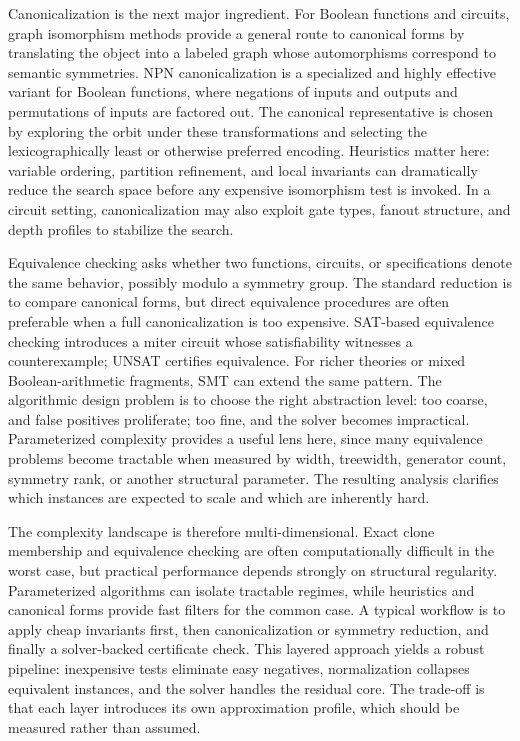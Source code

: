 \documentclass[11pt]{article}
\begin{document}
Canonicalization is the next major ingredient. For Boolean functions and circuits, graph isomorphism methods provide a general route to canonical forms by translating the object into a labeled graph whose automorphisms correspond to semantic symmetries. NPN canonicalization is a specialized and highly effective variant for Boolean functions, where negations of inputs and outputs and permutations of inputs are factored out. The canonical representative is chosen by exploring the orbit under these transformations and selecting the lexicographically least or otherwise preferred encoding. Heuristics matter here: variable ordering, partition refinement, and local invariants can dramatically reduce the search space before any expensive isomorphism test is invoked. In a circuit setting, canonicalization may also exploit gate types, fanout structure, and depth profiles to stabilize the search.

Equivalence checking asks whether two functions, circuits, or specifications denote the same behavior, possibly modulo a symmetry group. The standard reduction is to compare canonical forms, but direct equivalence procedures are often preferable when a full canonicalization is too expensive. SAT-based equivalence checking introduces a miter circuit whose satisfiability witnesses a counterexample; UNSAT certifies equivalence. For richer theories or mixed Boolean-arithmetic fragments, SMT can extend the same pattern. The algorithmic design problem is to choose the right abstraction level: too coarse, and false positives proliferate; too fine, and the solver becomes impractical. Parameterized complexity provides a useful lens here, since many equivalence problems become tractable when measured by width, treewidth, generator count, symmetry rank, or another structural parameter. The resulting analysis clarifies which instances are expected to scale and which are inherently hard.

The complexity landscape is therefore multi-dimensional. Exact clone membership and equivalence checking are often computationally difficult in the worst case, but practical performance depends strongly on structural regularity. Parameterized algorithms can isolate tractable regimes, while heuristics and canonical forms provide fast filters for the common case. A typical workflow is to apply cheap invariants first, then canonicalization or symmetry reduction, and finally a solver-backed certificate check. This layered approach yields a robust pipeline: inexpensive tests eliminate easy negatives, normalization collapses equivalent instances, and the solver handles the residual core. The trade-off is that each layer introduces its own approximation profile, which should be measured rather than assumed.
\end{document}
